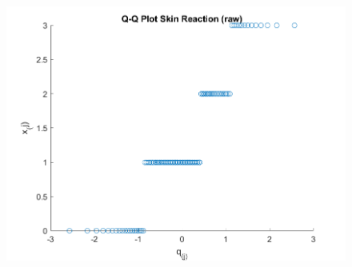 \begin{center}
    \begin{figure}[H]
        \centering
        \includegraphics[scale=0.6]{./matlab/chapter-4/sol4.32.qq.6.png}
    \end{figure}
\end{center}